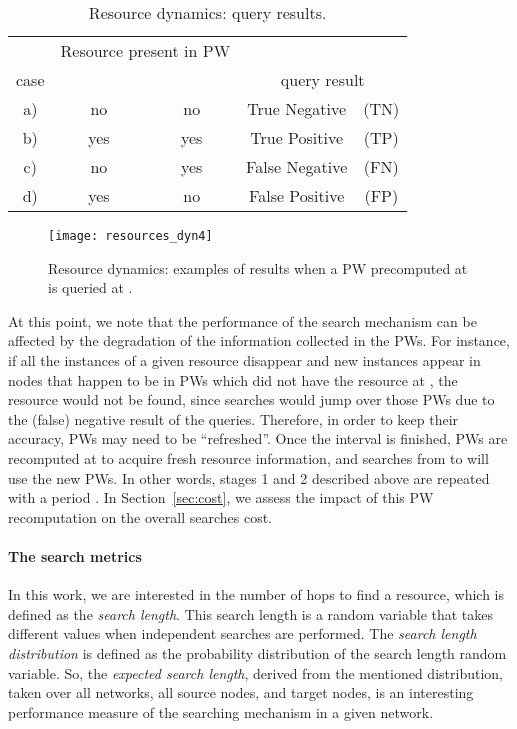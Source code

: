 \documentclass[]{elsarticle}
\begin{document}
\begin{table}
\centering
\begin{tabular}{ccccc} \hline
     & \multicolumn{2}{c}{\rule{0pt}{11pt}Resource present in PW} &  & \\ \cline{2-3}
case & \rule{0pt}{11pt}  &  &  \multicolumn{2}{c}{query result}  \\ \hline
a)   & no  & no  & True  Negative & (TN) \\
b)   & yes & yes & True  Positive & (TP) \\
c)   & no  & yes & False Negative & (FN) \\
d)   & yes & no  & False Positive & (FP) \\
\hline
\end{tabular}
\caption{Resource dynamics: query results.}
\label{tab:query_results}
\end{table}

\begin{figure}
 \centering
 \texttt{[image: resources\_dyn4]}
 \caption{Resource dynamics: examples of results when a PW precomputed at  is queried at .}
 \label{fig:resources_dyn}
\end{figure}

At this point, we note that the performance of the search mechanism can be affected by the degradation of the information collected in the PWs. For instance, if all the instances of a given resource disappear and 
new instances appear in nodes that happen to be in PWs which did not have the resource at , the resource would not be found, since searches would jump over those PWs due to the (false) negative result of the queries.
Therefore, in order to keep their accuracy, PWs may need to be ``refreshed''. 
Once the interval is finished, PWs are recomputed at  to acquire fresh resource information, and searches from  to  will use the new PWs. In other words, stages 1 and 2 described above are repeated with a period . In Section~\ref{sec:cost}, we assess the impact of this PW recomputation on the overall searches cost.


\paragraph{The search metrics}

In this work, we are interested in the number of hops to find a resource, which is defined as the \emph{search length}. This search length is a random variable that takes different values when independent searches are performed. The \emph{search length distribution} is defined as the probability distribution of the search length random variable. So, the \emph{expected search length}, derived from the mentioned distribution, taken over all networks, all source nodes, and target nodes, is an interesting performance measure of the searching mechanism in a given network. 
\end{document}

